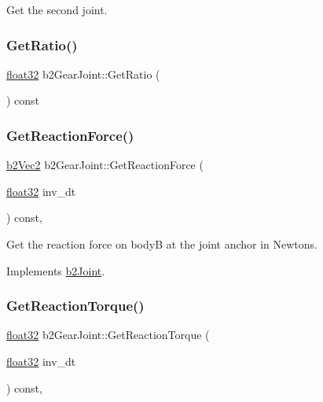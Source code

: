 Get the second joint. 

\mbox{\label{classb2_gear_joint_a46dffdce62bdf15a28c10a27d640bc10}} 
\subsubsection{\texorpdfstring{GetRatio()}{GetRatio()}}
{\footnotesize\ttfamily \mbox{\hyperlink{b2_settings_8h_aacdc525d6f7bddb3ae95d5c311bd06a1}{float32}} b2\+Gear\+Joint\+::\+Get\+Ratio (\begin{DoxyParamCaption}{ }\end{DoxyParamCaption}) const}

\mbox{\label{classb2_gear_joint_aa1dc4c7c58d8ee656726c372edb7abcd}} 
\subsubsection{\texorpdfstring{GetReactionForce()}{GetReactionForce()}}
{\footnotesize\ttfamily \mbox{\hyperlink{structb2_vec2}{b2\+Vec2}} b2\+Gear\+Joint\+::\+Get\+Reaction\+Force (\begin{DoxyParamCaption}\item[{\mbox{\hyperlink{b2_settings_8h_aacdc525d6f7bddb3ae95d5c311bd06a1}{float32}}}]{inv\+\_\+dt }\end{DoxyParamCaption}) const\hspace{0.3cm}{\ttfamily [override]}, {\ttfamily [virtual]}}



Get the reaction force on bodyB at the joint anchor in Newtons. 



Implements \mbox{\hyperlink{classb2_joint_a7e0eddefb9b69ad050b8ef6425838a74}{b2\+Joint}}.

\mbox{\label{classb2_gear_joint_a6c0f2f34c087085202b1a9506cd48fd1}} 
\subsubsection{\texorpdfstring{GetReactionTorque()}{GetReactionTorque()}}
{\footnotesize\ttfamily \mbox{\hyperlink{b2_settings_8h_aacdc525d6f7bddb3ae95d5c311bd06a1}{float32}} b2\+Gear\+Joint\+::\+Get\+Reaction\+Torque (\begin{DoxyParamCaption}\item[{\mbox{\hyperlink{b2_settings_8h_aacdc525d6f7bddb3ae95d5c311bd06a1}{float32}}}]{inv\+\_\+dt }\end{DoxyParamCaption}) const\hspace{0.3cm}{\ttfamily [override]}, {\ttfamily [virtual]}}



